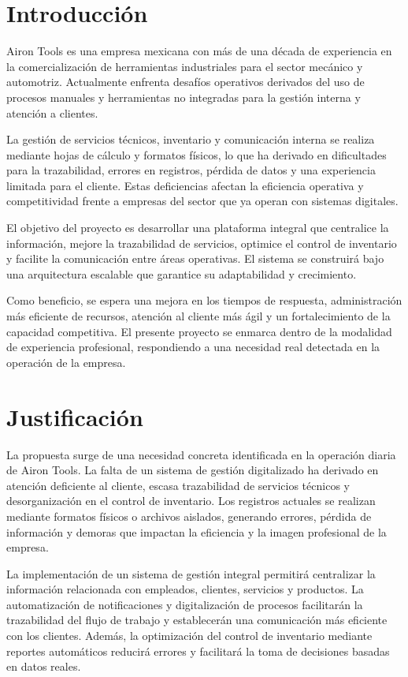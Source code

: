 \pagestyle{fancy}
\section{Introducción}

Airon Tools es una empresa mexicana con más de una década de experiencia en la comercialización de herramientas industriales para el sector mecánico y automotriz. Actualmente enfrenta desafíos operativos derivados del uso de procesos manuales y herramientas no integradas para la gestión interna y atención a clientes.

La gestión de servicios técnicos, inventario y comunicación interna se realiza mediante hojas de cálculo y formatos físicos, lo que ha derivado en dificultades para la trazabilidad, errores en registros, pérdida de datos y una experiencia limitada para el cliente. Estas deficiencias afectan la eficiencia operativa y competitividad frente a empresas del sector que ya operan con sistemas digitales.

El objetivo del proyecto es desarrollar una plataforma integral que centralice la información, mejore la trazabilidad de servicios, optimice el control de inventario y facilite la comunicación entre áreas operativas. El sistema se construirá bajo una arquitectura escalable que garantice su adaptabilidad y crecimiento.

Como beneficio, se espera una mejora en los tiempos de respuesta, administración más eficiente de recursos, atención al cliente más ágil y un fortalecimiento de la capacidad competitiva. El presente proyecto se enmarca dentro de la modalidad de experiencia profesional, respondiendo a una necesidad real detectada en la operación de la empresa.

\section{Justificación}

La propuesta surge de una necesidad concreta identificada en la operación diaria de Airon Tools. La falta de un sistema de gestión digitalizado ha derivado en atención deficiente al cliente, escasa trazabilidad de servicios técnicos y desorganización en el control de inventario. Los registros actuales se realizan mediante formatos físicos o archivos aislados, generando errores, pérdida de información y demoras que impactan la eficiencia y la imagen profesional de la empresa.

La implementación de un sistema de gestión integral permitirá centralizar la información relacionada con empleados, clientes, servicios y productos. La automatización de notificaciones y digitalización de procesos facilitarán la trazabilidad del flujo de trabajo y establecerán una comunicación más eficiente con los clientes. Además, la optimización del control de inventario mediante reportes automáticos reducirá errores y facilitará la toma de decisiones basadas en datos reales.

